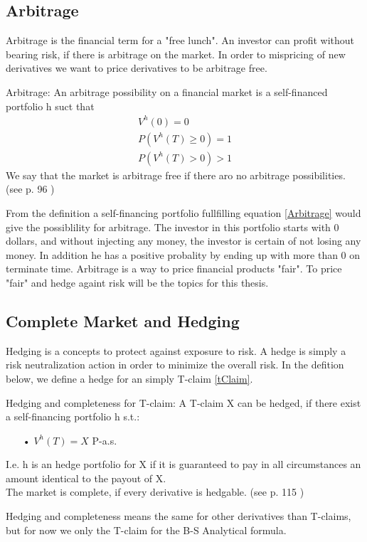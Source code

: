 \subsection{Arbitrage}
Arbitrage is the financial term for a "free lunch". An investor can profit without bearing risk, if there is arbitrage on the market. In order to mispricing of new derivatives we want to price derivatives to be arbitrage free.  
\theoremstyle{definition}
\begin{definition}{Arbitrage:}
An arbitrage possibility on a financial market is a self-financed portfolio h suct that
\begin{equation}\label{Arbitrage}
\begin{split}
V^{h}(0)=0\\
P(V^{h}(T)\geq 0)=1\\
P(V^{h}(T)>0)>1
\end{split}
\end{equation}
We say that the market is arbitrage free if there aro no arbitrage possibilities.\\
(see p. 96 \parencite{finKont})
\end{definition}
From the definition a self-financing portfolio fullfilling equation \eqref{Arbitrage} would give the possiblility for arbitrage. The investor in this portfolio starts with 0 dollars, and without injecting any money, the investor is certain of not losing any money. In addition he has a positive probality by ending up with more than 0 on terminate time. Arbitrage is a way to price financial products "fair". To price "fair" and hedge againt risk will be the topics for this thesis.


\subsection{Complete Market and Hedging}
Hedging is a concepts to protect against exposure to risk. A hedge is simply a risk neutralization action in order to minimize the overall risk. In the defition below, we define a hedge for an simply T-claim \eqref{tClaim}.
\theoremstyle{definition}
\begin{definition}{Hedging and completeness for T-claim:}
A T-claim X can be hedged, if there exist a self-financing portfolio h s.t.:
\begin{enumerate}
\item[•] $V^{h}(T)=X$ P-a.s.
\end{enumerate}
I.e. h is an hedge portfolio for X if it is guaranteed to pay in all circumstances an amount identical to the payout of X.\\
The market is complete, if every derivative is hedgable.
(see p. 115 \parencite{finKont})
\end{definition}
Hedging and completeness means the same for other derivatives than T-claims, but for now we only the T-claim for the B-S Analytical formula.

